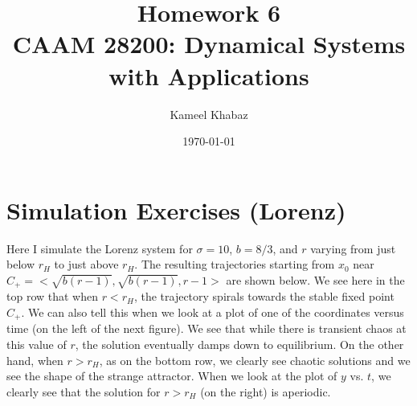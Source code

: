 \documentclass[11pt]{article}
\title{Homework 6 \large \\ CAAM 28200: Dynamical Systems with Applications}
\author{Kameel Khabaz}
\date{\today}
\begin{document}
\maketitle

\section*{Simulation Exercises (Lorenz)}
Here I simulate the Lorenz system for $\sigma = 10$, $ b = 8/3$, and $r$ varying from just below $r_H$ to just above $r_H$. The resulting trajectories starting from $x_0$ near $C_+ = <\sqrt{b(r-1)},\sqrt{b(r-1)}, r-1>$ are shown below. We see here in the top row that when $r < r_H$, the trajectory spirals towards the stable fixed point $C_+$. We can also tell this when we look at a plot of one of the coordinates versus time (on the left of the next figure). We see that while there is transient chaos at this value of $r$, the solution eventually damps down to equilibrium. On the other hand, when $r>r_H$, as on the bottom row, we clearly see chaotic solutions and we see the shape of the strange attractor. When we look at the plot of $y$ vs. $t$, we clearly see that the solution for $r > r_H$ (on the right) is aperiodic. 
\end{document}

